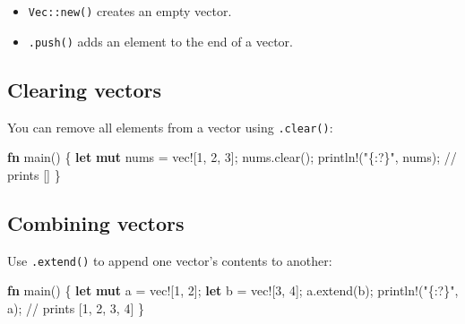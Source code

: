 \documentclass[
  letterpaper,
  DIV=11,
  numbers=noendperiod,
  oneside]{scrreprt}
\newenvironment{Shaded}{\begin{snugshade}}{\end{snugshade}}
\newcommand{\CommentTok}[1]{\textcolor[rgb]{0.37,0.37,0.37}{#1}}
\newcommand{\DecValTok}[1]{\textcolor[rgb]{0.68,0.00,0.00}{#1}}
\newcommand{\KeywordTok}[1]{\textcolor[rgb]{0.00,0.23,0.31}{\textbf{#1}}}
\newcommand{\NormalTok}[1]{\textcolor[rgb]{0.00,0.23,0.31}{#1}}
\newcommand{\OperatorTok}[1]{\textcolor[rgb]{0.37,0.37,0.37}{#1}}
\newcommand{\PreprocessorTok}[1]{\textcolor[rgb]{0.68,0.00,0.00}{#1}}
\newcommand{\StringTok}[1]{\textcolor[rgb]{0.13,0.47,0.30}{#1}}
\providecommand{\tightlist}{%
  \setlength{\itemsep}{0pt}\setlength{\parskip}{0pt}}\usepackage{longtable,booktabs,array}
\begin{document}
\begin{itemize}
\tightlist
\item
  \texttt{Vec::new()} creates an empty vector.
\item
  \texttt{.push()} adds an element to the end of a vector.
\end{itemize}

\subsection{Clearing vectors}\label{clearing-vectors}

You can remove all elements from a vector using \texttt{.clear()}:

\begin{Shaded}
\begin{Highlighting}[]
\KeywordTok{fn}\NormalTok{ main() }\OperatorTok{\{}
    \KeywordTok{let} \KeywordTok{mut}\NormalTok{ nums }\OperatorTok{=} \PreprocessorTok{vec!}\NormalTok{[}\DecValTok{1}\OperatorTok{,} \DecValTok{2}\OperatorTok{,} \DecValTok{3}\NormalTok{]}\OperatorTok{;}
\NormalTok{    nums}\OperatorTok{.}\NormalTok{clear()}\OperatorTok{;}
    \PreprocessorTok{println!}\NormalTok{(}\StringTok{"\{:?\}"}\OperatorTok{,}\NormalTok{ nums)}\OperatorTok{;} \CommentTok{// prints []}
\OperatorTok{\}}
\end{Highlighting}
\end{Shaded}

\subsection{Combining vectors}\label{combining-vectors}

Use \texttt{.extend()} to append one vector's contents to another:

\begin{Shaded}
\begin{Highlighting}[]
\KeywordTok{fn}\NormalTok{ main() }\OperatorTok{\{}
    \KeywordTok{let} \KeywordTok{mut}\NormalTok{ a }\OperatorTok{=} \PreprocessorTok{vec!}\NormalTok{[}\DecValTok{1}\OperatorTok{,} \DecValTok{2}\NormalTok{]}\OperatorTok{;}
    \KeywordTok{let}\NormalTok{ b }\OperatorTok{=} \PreprocessorTok{vec!}\NormalTok{[}\DecValTok{3}\OperatorTok{,} \DecValTok{4}\NormalTok{]}\OperatorTok{;}
\NormalTok{    a}\OperatorTok{.}\NormalTok{extend(b)}\OperatorTok{;}
    \PreprocessorTok{println!}\NormalTok{(}\StringTok{"\{:?\}"}\OperatorTok{,}\NormalTok{ a)}\OperatorTok{;} \CommentTok{// prints [1, 2, 3, 4]}
\OperatorTok{\}}
\end{Highlighting}
\end{Shaded}
\end{document}

